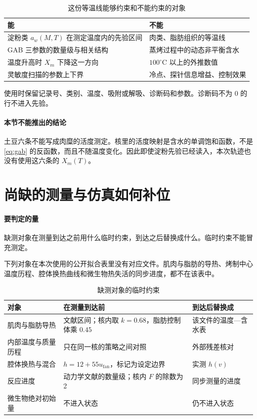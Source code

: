 \begin{table}[ht]
\centering
\caption{这份等温线能够约束和不能约束的对象}
\begin{tabularx}{\textwidth}{lX}
\toprule
能 & 不能 \\
\midrule
淀粉类 \(a_w(M,T)\) 在测定温度内的先验区间 & 肉类、脂肪组织的等温线 \\
GAB 三参数的数量级与相关结构 & 蒸烤过程中的动态非平衡含水 \\
温度升高时 \(X_m\) 下降这一方向 & \(100^\circ\mathrm{C}\) 以上的外推数值 \\
灵敏度扫描的参数上下界 & 冷点、探针信息增益、控制效果 \\
\bottomrule
\end{tabularx}
\end{table}

使用时保留记录号、类别、温度、吸附或解吸、诊断码和参数。诊断码不为 0 的行不进入先验。

\paragraph{本节不能推出的结论}
土豆六条不能写成肉糜的活度测定。核里的活度映射是含水的单调饱和函数，不是 \eqref{eq:gab} 的反函数，而且不随温度变化。因此即使淀粉先验已经读入，本次轨迹也没有使用这六条的 \(X_m(T)\)。

\section{尚缺的测量与仿真如何补位}

\paragraph{要判定的量}
缺测对象在测量到达之前用什么临时约束，到达之后替换成什么。临时约束不能冒充测定。

下列对象在本次使用的公开拟合表里没有对应文件。肌肉与脂肪的导热、烤制中心温度历程、腔体换热曲线和微生物热失活的同步进度，都不在该表中。

\begin{table}[ht]
\centering
\caption{缺测对象的临时约束}
\begin{tabularx}{\textwidth}{lXl}
\toprule
对象 & 在测量到达前 & 到达后替换成 \\
\midrule
肌肉与脂肪导热 & 文献区间；核内取 \(k=0.68\)，脂肪控制体乘 \(0.45\) & 该文件的温度—含水表 \\
内部温度与质量历程 & 只在同一核的策略之间对照 & 外部残差核对 \\
腔体换热与混合 & \(h=12+55u_{\mathrm{fan}}\)，标记为设定边界 & 实测 \(h(v)\) \\
反应进度 & 动力学文献的数量级；核内 \(F\) 的除数为 2 & 同步测量的进度 \\
微生物绝对初始量 & 不进入状态 & 仍不进入状态 \\
\bottomrule
\end{tabularx}
\end{table}

